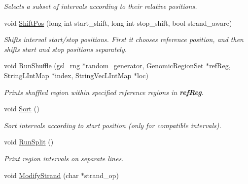 \begin{CompactItemize}
\begin{CompactList}\small\item\em Selects a subset of intervals according to their relative positions. \item\end{CompactList}\item 
void \hyperlink{classGenomicRegionSAM_fb2701ba1a521ae2c07ea0ace2f9ee77}{ShiftPos} (long int start\_\-shift, long int stop\_\-shift, bool strand\_\-aware)
\begin{CompactList}\small\item\em Shifts interval start/stop positions. First it chooses reference position, and then shifts start and stop positions separately. \item\end{CompactList}\item 
\hypertarget{classGenomicRegionSAM_b31fed1760d543fa3a38bb16a064dcf9}{
void \hyperlink{classGenomicRegionSAM_b31fed1760d543fa3a38bb16a064dcf9}{RunShuffle} (gsl\_\-rng $\ast$random\_\-generator, \hyperlink{classGenomicRegionSet}{GenomicRegionSet} $\ast$refReg, StringLIntMap $\ast$index, StringVecLIntMap $\ast$loc)}
\label{classGenomicRegionSAM_b31fed1760d543fa3a38bb16a064dcf9}

\begin{CompactList}\small\item\em Prints shuffled region within specified reference regions in {\bf refReg}. \item\end{CompactList}\item 
\hypertarget{classGenomicRegionSAM_8a27afdcdf11895d7b3f32bd8eed68ae}{
void \hyperlink{classGenomicRegionSAM_8a27afdcdf11895d7b3f32bd8eed68ae}{Sort} ()}
\label{classGenomicRegionSAM_8a27afdcdf11895d7b3f32bd8eed68ae}

\begin{CompactList}\small\item\em Sort intervals according to start position (only for compatible intervals). \item\end{CompactList}\item 
\hypertarget{classGenomicRegionSAM_e195a95ba837bfd9673093f1d451b39c}{
void \hyperlink{classGenomicRegionSAM_e195a95ba837bfd9673093f1d451b39c}{RunSplit} ()}
\label{classGenomicRegionSAM_e195a95ba837bfd9673093f1d451b39c}

\begin{CompactList}\small\item\em Print region intervals on separate lines. \item\end{CompactList}\item 
\hypertarget{classGenomicRegionSAM_beb76df49bb89ecf0f3074805d9fe7b2}{
void \hyperlink{classGenomicRegionSAM_beb76df49bb89ecf0f3074805d9fe7b2}{ModifyStrand} (char $\ast$strand\_\-op)}
\label{classGenomicRegionSAM_beb76df49bb89ecf0f3074805d9fe7b2}


\end{CompactItemize}
